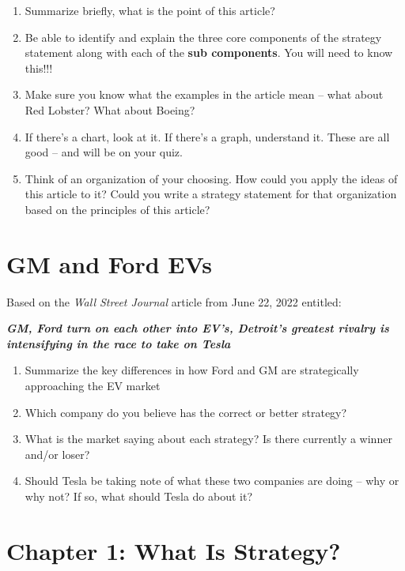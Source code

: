 \documentclass[
]{book}
\providecommand{\tightlist}{%
  \setlength{\itemsep}{0pt}\setlength{\parskip}{0pt}}
\begin{document}
\begin{enumerate}
\def\labelenumi{\arabic{enumi}.}
\item
  Summarize briefly, what is the point of this article?\\
\item
  Be able to identify and explain the three core components of the strategy statement along with each of the \textbf{sub components}. You will need to know this!!!
\item
  Make sure you know what the examples in the article mean -- what about Red Lobster? What about Boeing?
\item
  If there's a chart, look at it. If there's a graph, understand it. These are all good -- and will be on your quiz.
\item
  Think of an organization of your choosing. How could you apply the ideas of this article to it? Could you write a strategy statement for that organization based on the principles of this article?
\end{enumerate}

\hypertarget{gm-and-ford-evs}{%
\chapter{GM and Ford EVs}\label{gm-and-ford-evs}}

Based on the \emph{Wall Street Journal} article from June 22, 2022 entitled:

\textbf{\emph{GM, Ford turn on each other into EV's, Detroit's greatest rivalry is intensifying in the race to take on Tesla}}

\begin{enumerate}
\def\labelenumi{\arabic{enumi}.}
\tightlist
\item
  Summarize the key differences in how Ford and GM are strategically approaching the EV market
\item
  Which company do you believe has the correct or better strategy?
\item
  What is the market saying about each strategy? Is there currently a winner and/or loser?
\item
  Should Tesla be taking note of what these two companies are doing -- why or why not? If so, what should Tesla do about it?
\end{enumerate}

\hypertarget{chapter-1-what-is-strategy}{%
\chapter{Chapter 1: What Is Strategy?}\label{chapter-1-what-is-strategy}}
\end{document}
